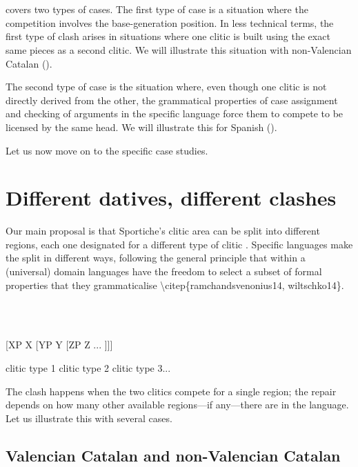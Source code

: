 \documentclass[output=paper,modfonts,nonflat]{langsci/langscibook}
\begin{document}
\ea%
    \label{ex:key:7}
    \gll\\
        \\
    \glt
    \z

         covers two types of cases. The first type of case is a situation where the competition involves the base-generation position. In less technical terms, the first type of clash arises in situations where one clitic is built using the exact same pieces as a second clitic. We will illustrate this situation with non-Valencian Catalan (). 

The second type of case is the situation where, even though one clitic is not directly derived from the other, the grammatical properties of case assignment and checking of arguments in the specific language force them to compete to be licensed by the same head. We will illustrate this for Spanish ().

Let us now move on to the specific case studies.

\section{Different datives, different clashes} %

Our main proposal is that Sportiche’s clitic area can be split into different regions, each one designated for a different type of clitic . Specific languages make the split in different ways, following the general principle that within a (universal) domain languages have the freedom to select a subset of formal properties that they grammaticalise {\textbackslash}citep\{ramchandsvenonius14, wiltschko14\}. 

\ea%
    \label{ex:key:8}
    \gll\\
        \\
    \glt
    \z

          [XP    X  [YP    Y  [ZP  Z  ...  ]]]

  clitic type 1    clitic type 2    clitic type 3...

The clash happens when the two clitics compete for a single region; the repair depends on how many other available regions—if any—there are in the language. Let us illustrate this with several cases.

\subsection{Valencian Catalan and non-Valencian Catalan} %
\end{document}
